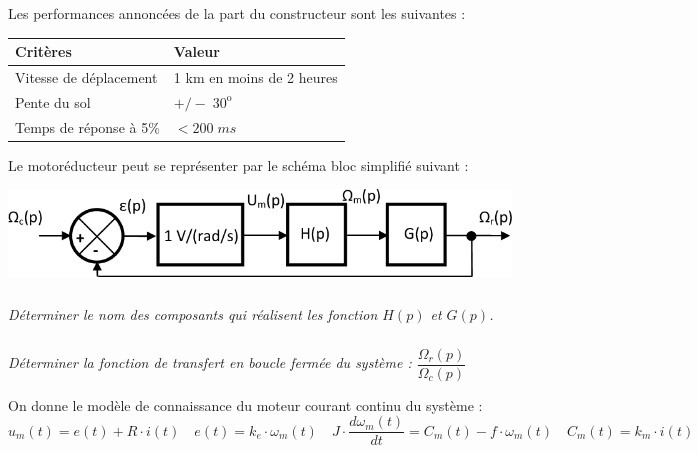 \documentclass[10pt]{article}
\begin{document}
\begin{minipage}[c]{.45\linewidth}

Les performances annoncées de la part du constructeur sont les suivantes : 
 
\end{minipage} \hfill
\begin{minipage}[c]{.52\linewidth}
\begin{center}
\begin{tabular}{|l|l|}
\hline
Critères & Valeur \\
\hline
\hline
Vitesse de déplacement & 1 km en moins de 2 heures\\
\hline
Pente du sol & $+/- \;  30^{\text{o}}$ \\
\hline
Temps de réponse à 5\% & $<200\; ms$ \\
\hline
\end{tabular}
\end{center}
\end{minipage}

\vspace{.5cm}

\begin{minipage}[c]{.45\linewidth}
Le motoréducteur peut se représenter par le schéma bloc simplifié suivant : 
\end{minipage} \hfill
\begin{minipage}[c]{.52\linewidth}
\begin{center}
\includegraphics[width=\textwidth]{images/fig_03}
\end{center}
\end{minipage}



\subparagraph{}
\textit{Déterminer le nom des composants qui réalisent les fonction $H(p)$ et $G(p)$.}

\subparagraph{}
\textit{ Déterminer la fonction de transfert en boucle fermée du système : $\dfrac{\Omega_r(p)}{\Omega_c(p)}$}


On donne le modèle de connaissance du moteur courant continu du système :
$$u_m(t) = e(t) + R\cdot i(t) 
\quad e(t) = k_e\cdot \omega_m(t) 
\quad J\cdot \dfrac{d\omega_m(t)}{dt} = C_m (t) -f\cdot \omega_m(t)
\quad C_m (t) = k_m \cdot i(t)$$
\end{document}
